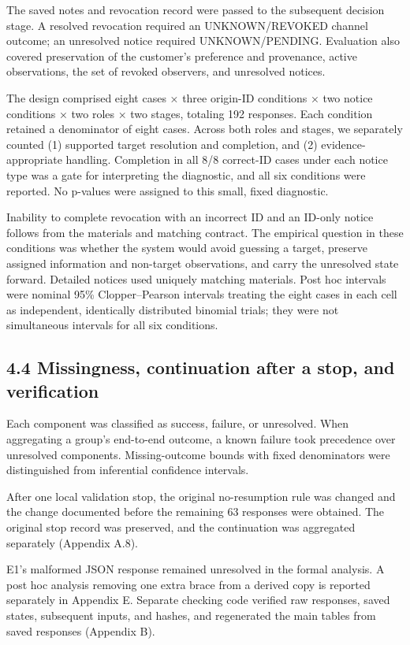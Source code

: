 \documentclass[10pt,a4paper]{article}
\begin{document}
The saved notes and revocation record were passed to the subsequent decision stage. A resolved revocation required an UNKNOWN/REVOKED channel outcome; an unresolved notice required UNKNOWN/PENDING. Evaluation also covered preservation of the customer's preference and provenance, active observations, the set of revoked observers, and unresolved notices.

The design comprised eight cases × three origin-ID conditions × two notice conditions × two roles × two stages, totaling 192 responses. Each condition retained a denominator of eight cases. Across both roles and stages, we separately counted (1) supported target resolution and completion, and (2) evidence-appropriate handling. Completion in all 8/8 correct-ID cases under each notice type was a gate for interpreting the diagnostic, and all six conditions were reported. No p-values were assigned to this small, fixed diagnostic.

Inability to complete revocation with an incorrect ID and an ID-only notice follows from the materials and matching contract. The empirical question in these conditions was whether the system would avoid guessing a target, preserve assigned information and non-target observations, and carry the unresolved state forward. Detailed notices used uniquely matching materials. Post hoc intervals were nominal 95\% Clopper--Pearson intervals treating the eight cases in each cell as independent, identically distributed binomial trials; they were not simultaneous intervals for all six conditions.

\subsection{4.4 Missingness, continuation after a stop, and verification}\label{paper-01-missingness-continuation-after-a-stop-and-verification}

Each component was classified as success, failure, or unresolved. When aggregating a group's end-to-end outcome, a known failure took precedence over unresolved components. Missing-outcome bounds with fixed denominators were distinguished from inferential confidence intervals.

After one local validation stop, the original no-resumption rule was changed and the change documented before the remaining 63 responses were obtained. The original stop record was preserved, and the continuation was aggregated separately (Appendix A.8).

E1's malformed JSON response remained unresolved in the formal analysis. A post hoc analysis removing one extra brace from a derived copy is reported separately in Appendix E. Separate checking code verified raw responses, saved states, subsequent inputs, and hashes, and regenerated the main tables from saved responses (Appendix B).
\end{document}
